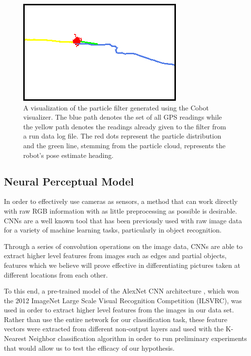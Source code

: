 \documentclass[letterpaper, 12 pt, conference]{ieeeconf}  %
\begin{document}
\begin{figure}[h]
\centering
\includegraphics[scale=1.0]{particle_filter_visual}
\caption{A visualization of the particle filter generated using the Cobot visualizer. The blue path denotes the set of all GPS readings while the yellow path denotes the readings already given to the filter from a run data log file. The red dots represent the particle distribution and the green line, stemming from the particle cloud, represents the robot's pose estimate heading.}
\end{figure}

\subsection{Neural Perceptual Model}
In order to effectively use cameras as sensors, a method that can work directly with raw RGB information with as little preprocessing as possible is desirable. CNNs are a well known tool that has been previously used with raw image data for a variety of machine learning tasks, particularly in object recognition. 
\par
Through a series of convolution operations on the image data, CNNs are able to extract higher level features from images such as edges and partial objects, features which we believe will prove effective in differentiating pictures taken at different locations from each other. 
\par
To this end, a pre-trained model of the AlexNet CNN architecture \cite{AlexNet}, which won the 2012 ImageNet Large Scale Visual Recognition Competition (ILSVRC), was used in order to extract higher level features from the images in our data set. Rather than use the entire network for our classification task, these feature vectors were extracted from different non-output layers and used with the K-Nearest Neighbor classification algorithm \cite{cover1967nearest} in order to run preliminary experiments that would allow us to test the efficacy of our hypothesis.  
\end{document}

